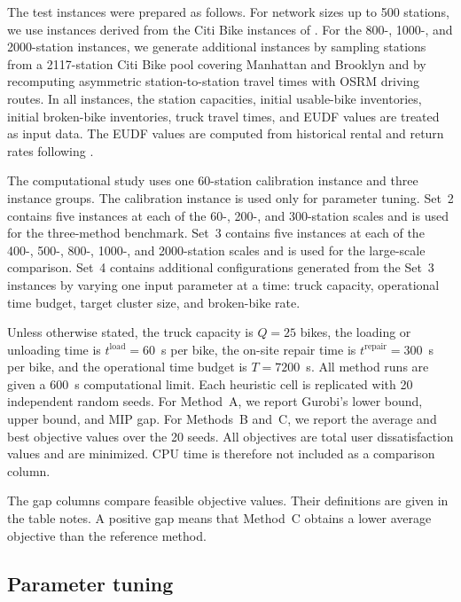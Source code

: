 The test instances were prepared as follows. For network sizes up to 500
stations, we use instances derived from the Citi Bike instances of
\citet{hoHybridLargeNeighborhood2017}.
For the 800-, 1000-, and 2000-station instances, we generate additional
instances by sampling stations from a 2117-station Citi Bike pool covering
Manhattan and Brooklyn and by recomputing asymmetric station-to-station travel
times with OSRM driving routes. In all instances, the station capacities,
initial usable-bike inventories, initial broken-bike inventories, truck travel
times, and EUDF values are treated as input data. The EUDF values are computed
from historical rental and return rates following
\citet{kaspiBikesharingSystemsUser2017}.

The computational study uses one 60-station calibration instance and three
instance groups. The calibration instance is used only for parameter tuning.
Set~2 contains five instances at each of the 60-, 200-, and 300-station scales
and is used for the three-method benchmark. Set~3 contains five instances at
each of the 400-, 500-, 800-, 1000-, and 2000-station scales and is used for the
large-scale comparison. Set~4 contains additional configurations generated from
the Set~3 instances by varying one input parameter at a time: truck capacity,
operational time budget, target cluster size, and broken-bike rate.

Unless otherwise stated, the truck capacity is $Q=25$ bikes, the loading or
unloading time is $t^{\mathrm{load}}=60$~s per bike, the on-site repair time is
$t^{\mathrm{repair}}=300$~s per bike, and the operational time budget is
$T=7200$~s. All method runs are given a 600~s computational limit. Each
heuristic cell is replicated with 20 independent random seeds. For Method~A, we
report Gurobi's lower bound, upper bound, and MIP gap. For Methods~B and~C, we
report the average and best objective values over the 20 seeds. All objectives
are total user dissatisfaction values and are minimized. CPU time is therefore
not included as a comparison column.

The gap columns compare feasible objective values. Their definitions are given
in the table notes. A positive gap means that Method~C obtains a lower average
objective than the reference method.

\subsection{Parameter tuning}\label{ch5:sec:exp-tuning}

